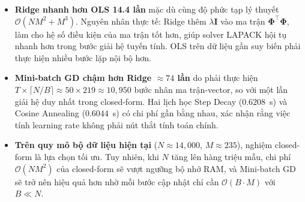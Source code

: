 \begin{itemize}[labelsep=10pt, leftmargin=2cm]
    \item \textbf{Ridge nhanh hơn OLS 14.4 lần} mặc dù cùng độ phức tạp lý thuyết
          $\mathcal{O}(NM^2 + M^3)$. Nguyên nhân thực tế: Ridge thêm $\lambda \mathbf{I}$
          vào ma trận $\boldsymbol{\Phi}^\top\boldsymbol{\Phi}$, làm cho hệ số điều kiện của
          ma trận tốt hơn, giúp solver LAPACK hội tụ nhanh hơn trong bước giải hệ tuyến tính.
          OLS trên dữ liệu gần suy biến phải thực hiện nhiều bước lặp nội bộ hơn.

    \item \textbf{Mini-batch GD chậm hơn Ridge $\approx 74$ lần} do phải thực hiện
          $T \times \lceil N/B \rceil \approx 50 \times 219 \approx 10{,}950$ bước
          nhân ma trận-vector, so với một lần giải hệ duy nhất trong closed-form. Hai lịch
          học Step Decay ($0.6208$~s) và Cosine Annealing ($0.6044$~s) có chi phí gần bằng
          nhau, xác nhận rằng việc tính learning rate không phải nút thắt tính toán chính.

    \item \textbf{Trên quy mô bộ dữ liệu hiện tại} ($N \approx 14{,}000$, $M \approx 235$),
          nghiệm closed-form là lựa chọn tối ưu. Tuy nhiên, khi $N$ tăng lên hàng triệu mẫu,
          chi phí $\mathcal{O}(NM^2)$ của closed-form sẽ vượt ngưỡng bộ nhớ RAM, và Mini-batch
          GD sẽ trở nên hiệu quả hơn nhờ mỗi bước cập nhật chỉ cần $\mathcal{O}(B \cdot M)$
          với $B \ll N$.
\end{itemize}

\clearpage

